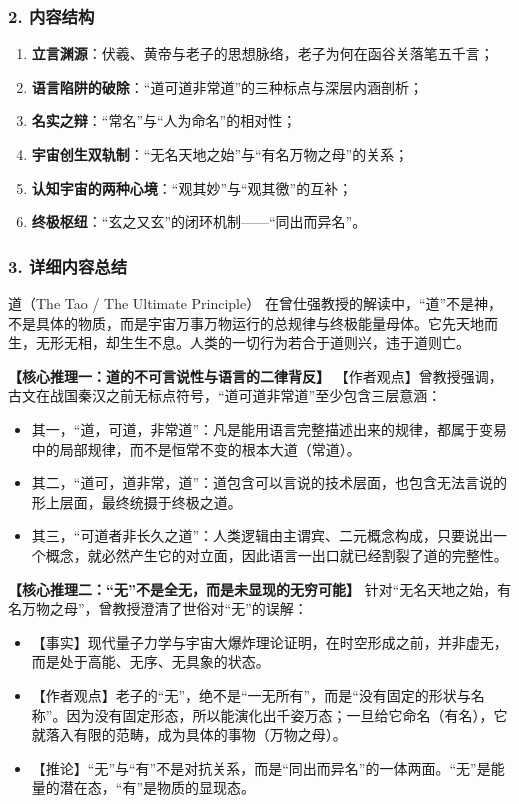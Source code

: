 \subsubsection{2. 内容结构}
\begin{enumerate}
    \item \textbf{立言渊源}：伏羲、黄帝与老子的思想脉络，老子为何在函谷关落笔五千言；
    \item \textbf{语言陷阱的破除}：“道可道非常道”的三种标点与深层内涵剖析；
    \item \textbf{名实之辩}：“常名”与“人为命名”的相对性；
    \item \textbf{宇宙创生双轨制}：“无名天地之始”与“有名万物之母”的关系；
    \item \textbf{认知宇宙的两种心境}：“观其妙”与“观其徼”的互补；
    \item \textbf{终极枢纽}：“玄之又玄”的闭环机制——“同出而异名”。
\end{enumerate}

\subsubsection{3. 详细内容总结}

\begin{ConceptBox}{道（The Tao / The Ultimate Principle）}
在曾仕强教授的解读中，“道”不是神，不是具体的物质，而是宇宙万事万物运行的总规律与终极能量母体。它先天地而生，无形无相，却生生不息。人类的一切行为若合于道则兴，违于道则亡。
\end{ConceptBox}

\noindent\textbf{【核心推理一：道的不可言说性与语言的二律背反】}
【作者观点】曾教授强调，古文在战国秦汉之前无标点符号，“道可道非常道”至少包含三层意涵：
\begin{itemize}
    \item 其一，“道，可道，非常道”：凡是能用语言完整描述出来的规律，都属于变易中的局部规律，而不是恒常不变的根本大道（常道）。
    \item 其二，“道可，道非常，道”：道包含可以言说的技术层面，也包含无法言说的形上层面，最终统摄于终极之道。
    \item 其三，“可道者非长久之道”：人类逻辑由主谓宾、二元概念构成，只要说出一个概念，就必然产生它的对立面，因此语言一出口就已经割裂了道的完整性。
\end{itemize}

\noindent\textbf{【核心推理二：“无”不是全无，而是未显现的无穷可能】}
针对“无名天地之始，有名万物之母”，曾教授澄清了世俗对“无”的误解：
\begin{itemize}
    \item 【事实】现代量子力学与宇宙大爆炸理论证明，在时空形成之前，并非虚无，而是处于高能、无序、无具象的状态。
    \item 【作者观点】老子的“无”，绝不是“一无所有”，而是“没有固定的形状与名称”。因为没有固定形态，所以能演化出千姿万态；一旦给它命名（有名），它就落入有限的范畴，成为具体的事物（万物之母）。
    \item 【推论】“无”与“有”不是对抗关系，而是“同出而异名”的一体两面。“无”是能量的潜在态，“有”是物质的显现态。
\end{itemize}

